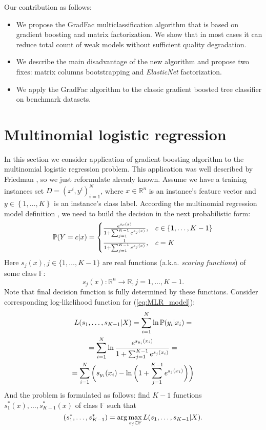 \documentclass{article}
\begin{document}
Our contribution as follows:
\begin{itemize}
\item We propose the GradFac multiclassification algorithm that is based on gradient boosting and matrix factorization. We show that in most cases it can reduce total count of weak models without sufficient quality degradation.
\item We describe the main disadvantage of the new algorithm and propose two fixes: matrix columns bootstrapping and \emph{ElasticNet} factorization. 
\item We apply the GradFac algorithm to the classic gradient boosted tree classifier on benchmark datasets.
\end{itemize}





\section{Multinomial logistic regression}
In this section we consider application of gradient boosting algorithm to the multinomial logistic regression problem. This application was well described by Friedman , so we just reformulate already known.
Assume we have a training instances set $D={(x^i, y^i)}_{i=1}^N$,  where $x\in\mathbb{R}^n$ is an instance's feature vector
and $y\in\left\{ 1,\dots,K\right\} $ is an instance's class label. According the multinomial regression model definition \cite{GLM}, we need to build the decision in the next probabilistic form:
\begin{equation}
	\mathbb{P}(Y = c \arrowvert x) =
	\begin{cases}
		\frac{ e^{s_{c}(x)} }
			 { 1+\sum_{j=1}^{K-1} e^{s_{j}(x)} }
		, & c \in \{1, \ldots, K-1 \} \\

		\frac{ 1 }
			 { 1 + \sum_{j=1}^{K-1} e^{s_{j}(x)} }
		, & c=K
	\end{cases}\label{eq:MLR_model}
\end{equation}
Here $s_{j}(x), j \in \{ 1, \ldots, K-1 \}$ are real functions (a.k.a. \textit{scoring functions}) of some class $\mathbb{F}$:
\[
	s_{j}(x): \mathbb{R}^{n} \rightarrow \mathbb{R}, j=1, \dots, K-1.
\]
Note that final decision function is fully determined by these functions.
Consider corresponding log-likelihood function for (\ref{eq:MLR_model}):
\begin{multline*}
	L(s_{1},\dots,s_{K-1} \arrowvert X) = \sum_{i=1}^{N} \ln \mathbb{P}(y_{i} \arrowvert x_{i}) =\\
	= \sum_{i=1}^{N} \ln\frac{ e^{s_{y_{i}}(x_{i})} }{ 1+\sum_{j=1}^{K-1} e^{s_{j}(x_{i})} } =\\
	= \sum_{i=1}^{N} \bigg( s_{y_{i}}(x_{i}) - \ln\bigg(1+\sum_{j=1}^{K-1}e^{s_{j}(x_{i})}\bigg) \bigg)
\end{multline*}
And the problem is formulated as follows: find $K-1$ functions $s_{1}^{*}(x),\dots,s_{K-1}^{*}(x)$ of class $\mathbb{F}$ such that
\begin{equation}
(s_{1}^{*}, \dots, s_{K-1}^{*}) = \arg\max_{s_{j} \in \mathbb{F}} L(s_{1},\dots,s_{K-1}\arrowvert X).\label{eq:argmaxL}
\end{equation}
\end{document}

